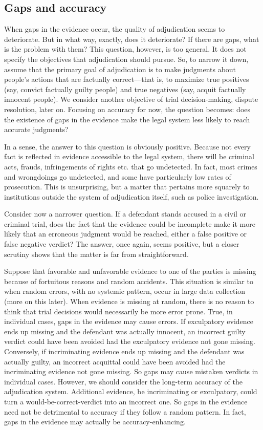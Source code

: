 \documentclass[
  10pt,
  dvipsnames,enabledeprecatedfontcommands]{scrartcl}
\begin{document}
\hypertarget{gaps-and-accuracy}{%
\subsection{Gaps and accuracy}\label{gaps-and-accuracy}}

When gaps in the evidence occur, the quality of adjudication seems to
deteriorate. But in what way, exactly, does it deteriorate? If there are
gaps, what is the problem with them? This question, however, is too
general. It does not specify the objectives that adjudication should
pursue. So, to narrow it down, assume that the primary goal of
adjudication is to make judgments about people's actions that are
factually correct---that is, to maximize true positives (say, convict
factually guilty people) and true negatives (say, acquit factually
innocent people). We consider another objective of trial
decision-making, dispute resolution, later on. Focusing on accuracy for
now, the question becomes: does the existence of gaps in the evidence
make the legal system less likely to reach accurate judgments?

In a sense, the answer to this question is obviously positive. Because
not every fact is reflected in evidence accessible to the legal system,
there will be criminal acts, frauds, infringements of rights etc. that
go undetected. In fact, most crimes and wrongdoings go undetected, and
some have particularly low rates of prosecution. This is unsurprising,
but a matter that pertains more squarely to institutions outside the
system of adjudication itself, such as police investigation.

Consider now a narrower question. If a defendant stands accused in a
civil or criminal trial, does the fact that the evidence could be
incomplete make it more likely that an erroneous judgment would be
reached, either a false positive or false negative verdict? The answer,
once again, seems positive, but a closer scrutiny shows that the matter
is far from straightforward.

Suppose that favorable and unfavorable evidence to one of the parties is
missing because of fortuitous reasons and random accidents. This
situation is similar to when random errors, with no systemic pattern,
occur in large data collection (more on this later). When evidence is
missing at random, there is no reason to think that trial decisions
would necessarily be more error prone. True, in individual cases, gaps
in the evidence may cause errors. If exculpatory evidence ends up
missing and the defendant was actually innocent, an incorrect guilty
verdict could have been avoided had the exculpatory evidence not gone
missing. Conversely, if incriminating evidence ends up missing and the
defendant was actually guilty, an incorrect acquittal could have been
avoided had the incriminating evidence not gone missing. So gaps may
cause mistaken verdicts in individual cases. However, we should consider
the long-term accuracy of the adjudication system. Additional evidence,
be incriminating or exculpatory, could turn a would-be-correct-verdict
into an incorrect one. So gaps in the evidence need not be detrimental
to accuracy if they follow a random pattern. In fact, gaps in the
evidence may actually be accuracy-enhancing.
\end{document}
